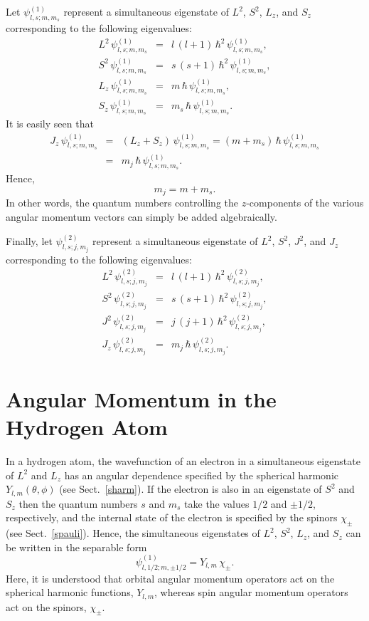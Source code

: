 Let $\psi^{(1)}_{l,s;m,m_s}$ represent a simultaneous eigenstate
of $L^2$, $S^2$, $L_z$, and $S_z$ corresponding to the following
eigenvalues:
\begin{eqnarray}
L^2\,\psi^{(1)}_{l,s;m,m_s}&=& l\,(l+1)\,\hbar^2\,\psi^{(1)}_{l,s;m,m_s},\\[0.5ex]
S^2\,\psi^{(1)}_{l,s;m,m_s}&=& s\,(s+1)\,\hbar^2\,\psi^{(1)}_{l,s;m,m_s},\\[0.5ex]
L_z\,\psi^{(1)}_{l,s;m,m_s}&=& m\,\hbar\,\psi^{(1)}_{l,s;m,m_s},\\[0.5ex]
S_z\,\psi^{(1)}_{l,s;m,m_s}&=& m_s\,\hbar\,\psi^{(1)}_{l,s;m,m_s}.
\end{eqnarray}
It is easily seen that
\begin{eqnarray}
J_z\,\psi^{(1)}_{l,s;m,m_s}& =& (L_z+S_z)\,\psi^{(1)}_{l,s;m,m_s}=
(m+m_s)\,\hbar\,\psi^{(1)}_{l,s;m,m_s}\nonumber\\[0.5ex] &= &m_j\,\hbar\,\psi^{(1)}_{l,s;m,m_s}.
\end{eqnarray}
Hence,
\begin{equation}
m_j = m+m_s.\label{e11.23}
\end{equation}
In other words, the quantum numbers controlling the $z$-components
of the various angular momentum vectors can simply be added algebraically.

Finally, let $\psi^{(2)}_{l,s;j,m_j}$ represent a simultaneous eigenstate
of $L^2$, $S^2$, $J^2$, and $J_z$ corresponding to the following
eigenvalues:
\begin{eqnarray}
L^2\,\psi^{(2)}_{l,s;j,m_j}&=& l\,(l+1)\,\hbar^2\,\psi^{(2)}_{l,s;j,m_j},\\[0.5ex]
S^2\,\psi^{(2)}_{l,s;j,m_j}&=& s\,(s+1)\,\hbar^2\,\psi^{(2)}_{l,s;j,m_j},\\[0.5ex]
J^2\,\psi^{(2)}_{l,s;j,m_j}&=& j\,(j+1)\,\hbar^2\,\psi^{(2)}_{l,s;j,m_j},\label{e11.26}\\[0.5ex]
J_z\,\psi^{(2)}_{l,s;j,m_j}&=& m_j\,\hbar\,\psi^{(2)}_{l,s;j,m_j}.
\end{eqnarray}

\section{Angular Momentum in the Hydrogen Atom}\label{s11.3}
In a hydrogen atom, the wavefunction of an electron   in a simultaneous
eigenstate of $L^2$ and $L_z$ has an angular dependence specified
by the spherical harmonic $Y_{l,m}(\theta,\phi)$ (see Sect.~\ref{sharm}).
If the electron is also in an eigenstate of $S^2$ and $S_z$ then the
quantum numbers $s$ and $m_s$ take the values $1/2$ and $\pm 1/2$,
respectively, and the internal state of the electron is  specified
by the spinors $\chi_\pm$ (see Sect.~\ref{spauli}). Hence, the
simultaneous eigenstates of $L^2$, $S^2$, $L_z$, and $S_z$ can be written
in the separable form
\begin{equation}\label{e11.28}
\psi^{(1)}_{l,1/2;m,\pm 1/2} = Y_{l,m}\,\chi_\pm.
\end{equation}
Here, it is understood that orbital angular momentum operators act on
the spherical harmonic functions, $Y_{l,m}$, whereas spin angular momentum operators act
on the spinors, $\chi_\pm$. 

